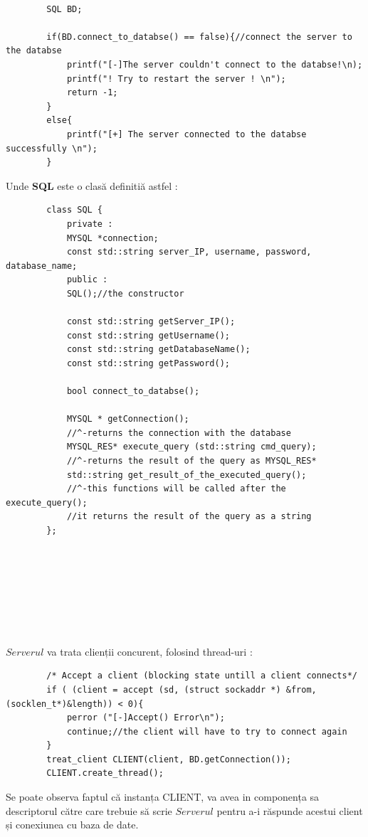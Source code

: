 \documentclass[runningheads]{llncs}
\begin{document}
	\begin{verbatim} 
		
		SQL BD;
		
		if(BD.connect_to_databse() == false){//connect the server to the databse
			printf("[-]The server couldn't connect to the databse!\n);
			printf("! Try to restart the server ! \n");
			return -1;
		}
		else{
			printf("[+] The server connected to the databse successfully \n");
		}
	\end{verbatim} 
	Unde \textbf{SQL} este o clasă definitiă astfel : 
	\begin{verbatim}
		class SQL {
			private :
			MYSQL *connection;
			const std::string server_IP, username, password, database_name;
			public :
			SQL();//the constructor
			
			const std::string getServer_IP();
			const std::string getUsername();
			const std::string getDatabaseName();
			const std::string getPassword();
			
			bool connect_to_databse();
			
			MYSQL * getConnection();
			//^-returns the connection with the database
			MYSQL_RES* execute_query (std::string cmd_query);
			//^-returns the result of the query as MYSQL_RES*
			std::string get_result_of_the_executed_query();
			//^-this functions will be called after the execute_query();
			//it returns the result of the query as a string
		};
	\end{verbatim}
	\\
	\\
	\\
	\\
	\\  
	\\
	\\
	\hypertarget{sec:ServerCreateThread}{$Serverul $} va trata clienții concurent, folosind thread-uri : 
	\begin{verbatim}
		/* Accept a client (blocking state untill a client connects*/
		if ( (client = accept (sd, (struct sockaddr *) &from, (socklen_t*)&length)) < 0){
			perror ("[-]Accept() Error\n");
			continue;//the client will have to try to connect again
		}
		treat_client CLIENT(client, BD.getConnection());
		CLIENT.create_thread();
	\end{verbatim}
	Se poate observa faptul că instanța CLIENT, va avea in componența sa descriptorul către care trebuie să scrie $Serverul$ pentru a-i răspunde acestui client și conexiunea cu baza de date.
\end{document}
